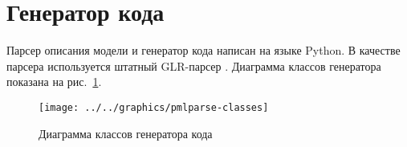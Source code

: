 \section{Генератор кода}
\label{sec:promela-parser}

Парсер описания модели и генератор кода написан на языке Python. В качестве парсера
используется штатный GLR-парсер . Диаграмма классов генератора показана на
рис.~\ref{fig:pmlparse-classes}.

\begin{figure}[ht]
  \centering
  \texttt{[image: ../../graphics/pmlparse-classes]}
  \caption{Диаграмма классов генератора кода}
  \label{fig:pmlparse-classes}
\end{figure}





